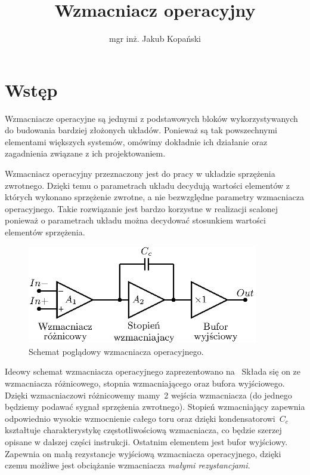 \documentclass[twoside,pl,final]{labman}
\title{Wzmacniacz operacyjny}
\author{mgr inż. Jakub Kopański}
\begin{document}
\maketitle
\tableofcontents
\clearpage
\listoffigures
\clearpage

\chapter{Wstęp}
\label{intro}
Wzmacniacze operacyjne są jednymi z podstawowych bloków
wykorzystywanych do budowania bardziej złożonych układów.
Ponieważ są tak powszechnymi elementami większych systemów,
omówimy dokładnie ich działanie oraz
zagadnienia związane z ich projektowaniem.

Wzmacniacz operacyjny przeznaczony jest do
pracy w układzie sprzężenia zwrotnego.
Dzięki temu o parametrach układu decydują
wartości elementów z których wykonano sprzężenie zwrotne,
a nie bezwzględne parametry wzmacniacza operacyjnego.
Takie rozwiązanie jest bardzo korzystne w realizacji scalonej
ponieważ o parametrach układu można decydować
stosunkiem wartości elementów sprzężenia.

\begin{figure}[!htbp]
  \centering
  \includegraphics[width=0.9\textwidth]{idea}
  \caption{Schemat poglądowy wzmacniacza operacyjnego.}
  \label{fig:idea}
\end{figure}

Ideowy schemat wzmacniacza operacyjnego
zaprezentowano na~
Składa się on ze wzmacniacza różnicowego,
stopnia wzmacniającego oraz bufora wyjściowego.
Dzięki wzmacniaczowi różnicowemy mamy~2 wejścia wzmacniacza
(do jednego będziemy podawać sygnał sprzężenia zwrotnego).
Stopień wzmacniający zapewnia odpowiednio wysokie
wzmocnienie całego toru oraz dzięki kondensatorowi~$C_c$
kształtuje charakterystykę częstotliwościową wzmacniacza,
co będzie szerzej opisane w dalszej części instrukcji.
Ostatnim elementem jest bufor wyjściowy.
Zapewnia on małą rezystancje wyjściową wzmacniacza operacyjnego,
dzięki czemu możliwe jest obciążanie wzmacniacza \emph{małymi rezystancjami}.
\end{document}
